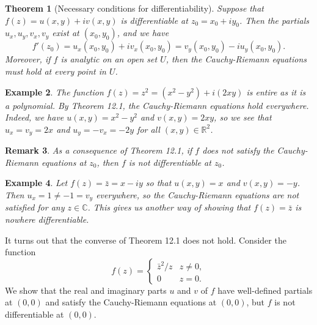 \documentclass[10pt]{article}
\newcommand{\R}{\mathbb{R}}
\newcommand{\C}{\mathbb{C}}
\theoremstyle{newstyle}
\newtheorem{thm}{Theorem}[section]
\newtheorem{remark}[thm]{Remark}
\newtheorem{exmp}[thm]{Example}
\begin{document}
\begin{thm}[Necessary conditions for differentiability]
Suppose that $f(z) = u(x, y) + iv(x, y)$ is differentiable at $z_0 = x_0 + iy_0$. 
Then the partials $u_x, u_y, v_x, v_y$ exist at $(x_0, y_0)$, and we have 
\[ f'(z_0) = u_x(x_0, y_0) + iv_x(x_0, y_0) = v_y(x_0, y_0) - iu_y(x_0, y_0). \]
Moreover, if $f$ is analytic on an open set $U$, then the Cauchy-Riemann equations must hold at every 
point in $U$. 
\end{thm}

\begin{exmp}
The function $f(z) = z^2 = (x^2 - y^2) + i(2xy)$ is entire as it is a polynomial. 
By Theorem 12.1, the Cauchy-Riemann equations hold everywhere. Indeed, we have 
$u(x, y) = x^2 - y^2$ and $v(x, y) = 2xy$, so we see that $u_x = v_y = 2x$ and 
$u_y = -v_x = -2y$ for all $(x, y) \in \R^2$. 
\end{exmp}

\begin{remark}
As a consequence of Theorem 12.1, if $f$ does not satisfy the Cauchy-Riemann equations at $z_0$, 
then $f$ is not differentiable at $z_0$. 
\end{remark}

\begin{exmp}
Let $f(z) = \bar{z} = x - iy$ so that $u(x, y) = x$ and $v(x, y) = -y$. Then $u_x = 1 \neq -1 = v_y$
everywhere, so the Cauchy-Riemann equations are not satisfied for any $z \in \C$. This 
gives us another way of showing that $f(z) = \bar{z}$ is nowhere differentiable. 
\end{exmp}

It turns out that the converse of Theorem 12.1 does not hold. Consider the function 
\[ f(z) = \begin{cases} \bar{z}^2/z & z \neq 0, \\ 0 & z = 0. \end{cases} \]
We show that the real and imaginary parts $u$ and $v$ of $f$ have well-defined partials at $(0, 0)$ 
and satisfy the Cauchy-Riemann equations at $(0, 0)$, but $f$ is not differentiable at $(0, 0)$.
\end{document}
